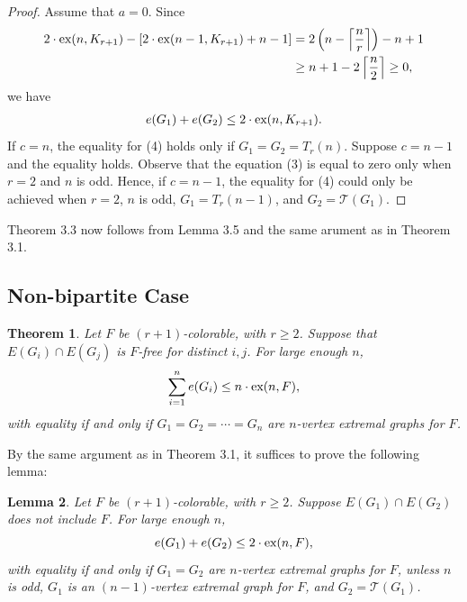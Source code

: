 \documentclass[a4paper]{article}
\newtheorem{theorem}{Theorem}[section]
\newtheorem{lemma}[theorem]{Lemma}
\begin{document}
\begin{proof}
  Assume that $a = 0$. Since
  \begin{align}
    2 \cdot \textnormal{ex}(n, K_{r + 1}) - [2 \cdot \textnormal{ex}(n - 1, K_{r + 1}) + n - 1]
    &= 2\left(n - \left\lceil \frac{n}{r} \right\rceil\right) - n + 1 \\
    &\geq n + 1 - 2\left\lceil \frac{n}{2} \right\rceil \geq 0, \nonumber
  \end{align}
  we have
  \begin{gather}
    e(G_1) + e(G_2) \leq 2 \cdot \textnormal{ex}(n, K_{r + 1}).
  \end{gather}
  If $c = n$, the equality for (4) holds only if $G_1 = G_2 = T_r(n)$. Suppose $c = n - 1$ and the
  equality holds. Observe that the equation (3) is equal to zero only when $r = 2$ and $n$ is odd.
  Hence, if $c = n - 1$, the equality for (4) could only be achieved when $r = 2$, $n$ is odd, $G_1
  = T_r(n - 1)$, and $G_2 = \mathcal{T}(G_1)$.
\end{proof}

Theorem 3.3 now follows from Lemma 3.5 and the same arument as in Theorem 3.1.

\subsection{Non-bipartite Case}

\begin{theorem}
  Let $F$ be $(r + 1)$-colorable, with $r \geq 2$. Suppose that $E(G_i) \cap E(G_j)$ is $F$-free for
  distinct $i, j$. For large enough $n$,
  \[
    \sum_{i = 1}^n e(G_i) \leq n \cdot \textnormal{ex}(n, F),
  \]
  with equality if and only if $G_1 = G_2 = \cdots = G_n$ are $n$-vertex extremal graphs for $F$.
\end{theorem}

By the same argument as in Theorem 3.1, it suffices to prove the following lemma:

\begin{lemma}
  Let $F$ be $(r + 1)$-colorable, with $r \geq 2$. Suppose $E(G_1) \cap E(G_2)$ does not include
  $F$. For large enough $n$,
  \[
    e(G_1) + e(G_2) \leq 2 \cdot \textnormal{ex}(n, F),
  \]
  with equality if and only if $G_1 = G_2$ are $n$-vertex extremal graphs for $F$, unless $n$ is
  odd, $G_1$ is an $(n - 1)$-vertex extremal graph for $F$, and $G_2 = \mathcal{T}(G_1)$. 
\end{lemma}
\end{document}
